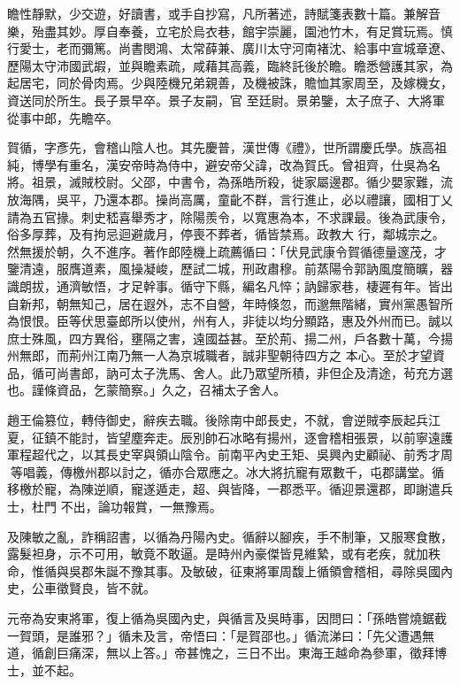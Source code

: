 \begin{pinyinscope}
 瞻性靜默，少交遊，好讀書，或手自抄寫，凡所著述，詩賦箋表數十篇。兼解音樂，殆盡其妙。厚自奉養，立宅於烏衣巷，館宇崇麗，園池竹木，有足賞玩焉。慎行愛士，老而彌篤。尚書閔鴻、太常薛兼、廣川太守河南褚沈、給事中宣城章遼、歷陽太守沛國武嘏，並與瞻素疏，咸藉其高義，臨終託後於瞻。瞻悉營護其家，為起居宅，同於骨肉焉。少與陸機兄弟親善，及機被誅，贍恤其家周至，及嫁機女，資送同於所生。長子景早卒。景子友嗣，官
 至廷尉。景弟鑒，太子庶子、大將軍從事中郎，先瞻卒。



 賀循，字彥先，會稽山陰人也。其先慶普，漢世傳《禮》，世所謂慶氏學。族高祖純，博學有重名，漢安帝時為侍中，避安帝父諱，改為賀氏。曾祖齊，仕吳為名將。祖景，滅賊校尉。父邵，中書令，為孫皓所殺，徙家屬邊郡。循少嬰家難，流放海隅，吳平，乃還本郡。操尚高厲，童齔不群，言行進止，必以禮讓，國相丁乂請為五官掾。刺史嵇喜舉秀才，除陽羨令，以寬惠為本，不求課最。後為武康令，俗多厚葬，及有拘忌迴避歲月，停喪不葬者，循皆禁焉。政教大
 行，鄰城宗之。然無援於朝，久不進序。著作郎陸機上疏薦循曰：「伏見武康令賀循德量邃茂，才鑒清遠，服膺道素，風操凝峻，歷試二城，刑政肅穆。前蒸陽令郭訥風度簡曠，器識朗拔，通濟敏悟，才足幹事。循守下縣，編名凡悴；訥歸家巷，棲遲有年。皆出自新邦，朝無知己，居在遐外，志不自營，年時倏忽，而邈無階緒，實州黨愚智所為恨恨。臣等伏思臺郎所以使州，州有人，非徒以均分顯路，惠及外州而已。誠以庶士殊風，四方異俗，壅隔之害，遠國益甚。至於荊、揚二州，戶各數十萬，今揚州無郎，而荊州江南乃無一人為京城職者，誠非聖朝待四方之
 本心。至於才望資品，循可尚書郎，訥可太子洗馬、舍人。此乃眾望所積，非但企及清途，茍充方選也。謹條資品，乞蒙簡察。」久之，召補太子舍人。



 趙王倫篡位，轉侍御史，辭疾去職。後除南中郎長史，不就，會逆賊李辰起兵江夏，征鎮不能討，皆望塵奔走。辰別帥石冰略有揚州，逐會稽相張景，以前寧遠護軍程超代之，以其長史宰與領山陰令。前南平內史王矩、吳興內史顧祕、前秀才周等唱義，傳檄州郡以討之，循亦合眾應之。冰大將抗寵有眾數千，屯郡講堂。循移檄於寵，為陳逆順，寵遂遁走，超、與皆降，一郡悉平。循迎景還郡，即謝遣兵士，杜門
 不出，論功報賞，一無豫焉。



 及陳敏之亂，詐稱詔書，以循為丹陽內史。循辭以腳疾，手不制筆，又服寒食散，露髮袒身，示不可用，敏竟不敢逼。是時州內豪傑皆見維縶，或有老疾，就加秩命，惟循與吳郡朱誕不豫其事。及敏破，征東將軍周馥上循領會稽相，尋除吳國內史，公車徵賢良，皆不就。



 元帝為安東將軍，復上循為吳國內史，與循言及吳時事，因問曰：「孫皓嘗燒鋸截一賀頭，是誰邪？」循未及言，帝悟曰：「是賀邵也。」循流涕曰：「先父遭遇無道，循創巨痛深，無以上答。」帝甚愧之，三日不出。東海王越命為參軍，徵拜博士，並不起。




\end{pinyinscope}
